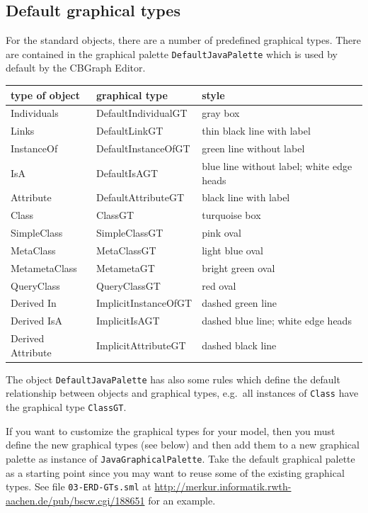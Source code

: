 \subsection{Default graphical types}
\label{sec:defaultgraphtypes}

For the standard objects, there are a number of predefined graphical
types. There are contained in the graphical palette {\tt DefaultJavaPalette}
which is used by default by the CBGraph Editor.

\begin{center}
\begin{tabular}{|l|l|l|} \hline
{\bf type of object} & {\bf graphical type} & {\bf style} \\ \hline \hline
Individuals & DefaultIndividualGT & gray box \\ \hline
Links & DefaultLinkGT & thin black line with label\\ \hline
InstanceOf & DefaultInstanceOfGT & green line without label \\ \hline
IsA & DefaultIsAGT & blue line without label; white edge heads \\ \hline
Attribute & DefaultAttributeGT & black line with label\\ \hline
Class & ClassGT & turquoise box\\ \hline
SimpleClass & SimpleClassGT & pink oval\\ \hline
MetaClass & MetaClassGT & light blue oval\\ \hline
MetametaClass & MetametaGT & bright green oval\\ \hline
QueryClass & QueryClassGT & red oval\\ \hline
Derived In & ImplicitInstanceOfGT & dashed green line\\ \hline
Derived IsA & ImplicitIsAGT & dashed blue line; white edge heads\\ \hline
Derived Attribute & ImplicitAttributeGT & dashed black line \\ \hline
\end{tabular}
\end{center}

The object {\tt DefaultJavaPalette} has also some rules which define
the default relationship between objects and graphical types, e.g.\
all instances of {\tt Class} have the graphical type {\tt ClassGT}.

If you want to customize the graphical types for your model, then
you must define the new graphical types (see below) and then add
them to a new graphical palette as instance of {\tt JavaGraphicalPalette}.
Take the default graphical palette
as a starting point since you may want to reuse some of the existing
graphical types. See file {\tt 03-ERD-GTs.sml} at
\url{http://merkur.informatik.rwth-aachen.de/pub/bscw.cgi/188651}
for an example.

